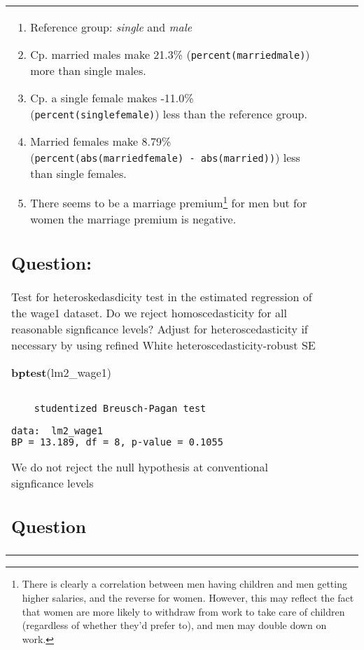 \documentclass[12pt,]{article}
\newenvironment{Shaded}{\begin{snugshade}}{\end{snugshade}}
\newcommand{\KeywordTok}[1]{\textcolor[rgb]{0.13,0.29,0.53}{\textbf{#1}}}
\newcommand{\NormalTok}[1]{#1}
\providecommand{\tightlist}{%
  \setlength{\itemsep}{0pt}\setlength{\parskip}{0pt}}
\let\rmarkdownfootnote\footnote%
\def\footnote{\protect\rmarkdownfootnote}
\begin{document}
\begin{tabularx}{0.5\textwidth}{p{} p{} p{} p{}}
\begin{enumerate}
\def\labelenumi{\arabic{enumi}.}
\tightlist
\item
  Reference group: \emph{single} and \emph{male}
\item
  Cp. married males make 21.3\% (\texttt{percent(marriedmale)}) more
  than single males.
\item
  Cp. a single female makes -11.0\% (\texttt{percent(singlefemale)})
  less than the reference group.
\item
  Married females make 8.79\%
  (\texttt{percent(abs(marriedfemale)\ -\ abs(married))}) less than
  single females.
\item
  There seems to be a marriage premium\footnote{There is clearly a
    correlation between men having children and men getting higher
    salaries, and the reverse for women. However, this may reflect the
    fact that women are more likely to withdraw from work to take care
    of children (regardless of whether they'd prefer to), and men may
    double down on work.} for men but for women the marriage premium is
  negative.
\end{enumerate}

\hypertarget{question-15}{%
\subsection{Question:}\label{question-15}}

Test for heteroskedasdicity test in the estimated regression of the
wage1 dataset. Do we reject homoscedasticity for all reasonable
signficance levels? Adjust for heteroscedasticity if necessary by using
refined White heteroscedasticity-robust SE

\begin{Shaded}
\begin{Highlighting}[]
\KeywordTok{bptest}\NormalTok{(lm2_wage1)}
\end{Highlighting}
\end{Shaded}

\begin{verbatim}

    studentized Breusch-Pagan test

data:  lm2_wage1
BP = 13.189, df = 8, p-value = 0.1055
\end{verbatim}

We do not reject the null hypothesis at conventional signficance levels

\hypertarget{question-16}{%
\subsection{Question}\label{question-16}}


\end{tabularx}
\end{document}
